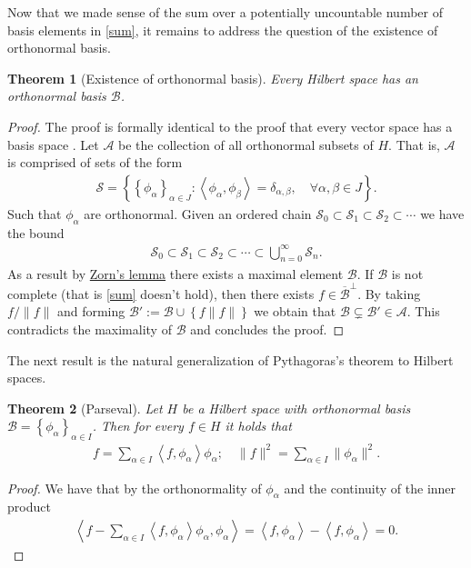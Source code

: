 \documentclass[12pt]{article}
\newtheorem{theorem}{Theorem}
\newcommand{\br}[1]{\left\langle#1\right\rangle} \newcommand{\set}[1]{\left\{#1\right\}}\newcommand{\qt}[1]{\left(#1\right)} \newcommand{\qp}[1]{\left(#1\right)}\newcommand{\qb}[1]{\left[#1\right]}
\renewcommand{\norm}[1]{\lVert #1 \rVert}\renewcommand{\abs}[1]{\left| #1 \right|}
\newcommand{\Aa}{\mathcal{A}}\newcommand{\Bb}{\mathcal{B}}\newcommand{\Cc}{\mathcal{C}}\newcommand{\Dd}{\mathcal{D}}\newcommand{\Ee}{\mathcal{E}}\newcommand{\Ff}{\mathcal{F}}\newcommand{\Gg}{\mathcal{G}}\newcommand{\Hh}{\mathcal{H}}\newcommand{\Kk}{\mathcal{K}}\newcommand{\Ll}{\mathcal{L}}\newcommand{\Mm}{\mathcal{M}}\newcommand{\Nn}{\mathcal{N}}\newcommand{\Pp}{\mathcal{P}}\newcommand{\Qq}{\mathcal{Q}}\newcommand{\Rr}{\mathcal{R}}\newcommand{\Ss}{\mathcal{S}}\newcommand{\Tt}{\mathcal{T}}\newcommand{\Uu}{\mathcal{U}}\newcommand{\Ww}{\mathcal{W}}\newcommand{\XX}{\mathcal {X}}\newcommand{\Zz}{\mathcal{Z}}
\begin{document}
\begin{CJK*}{UTF8}{gbsn}
	Now that we made sense of the sum over a potentially uncountable number of basis elements in \eqref{sum}, it remains to address the question of the existence of orthonormal basis.
	\begin{theorem}[Existence of orthonormal basis]\label{existence} Every Hilbert space has an orthonormal basis $\Bb$.
	\end{theorem}
	\begin{proof}
		The proof is formally identical to the proof that every vector space has a basis space . Let $\Aa$ be the collection of all orthonormal subsets of $H$. That is,  $\Aa$ is comprised of sets of the form
		\begin{align*}
			\Ss=\set{\set{\phi_\alpha}_{\alpha \in  J}:  \br{\phi_\alpha,\phi_\beta }= \delta _{\alpha, \beta }, \quad\forall \alpha,\beta \in J} .
		\end{align*}
		Such that $\phi_\alpha$ are orthonormal. Given an ordered chain $\Ss_0\subset \Ss_1\subset \Ss_2\subset \cdots$ we have the bound
		\begin{align*}
			\Ss_0\subset \Ss_1\subset \Ss_2\subset \cdots \subset \bigcup_{n=0}^\infty \Ss_n  .
		\end{align*}
		As a result by \href{https://en.wikipedia.org/wiki/Zorn%27s_lemma}{Zorn's lemma} there exists a maximal element $\Bb$. If $\Bb$ is not complete (that is \eqref{sum} doesn't hold), then there exists $f \in \overline{\Bb}^\perp$. By taking $f /\norm{f}$ and forming $\Bb':=\Bb \cup \set{f \norm{f}} $ we obtain that $\Bb \subsetneq \Bb' \in \Aa$. This contradicts the maximality of $\Bb$ and concludes the proof.
	\end{proof}
	The next result is the natural  generalization of Pythagoras's theorem to Hilbert spaces.
	\begin{theorem}[Parseval]\label{Parseval}
		Let $H$ be a Hilbert space with orthonormal basis  $\Bb=\set{\phi_\alpha}_{\alpha\in I}$. Then for every $f \in  H$ it holds that
		\begin{align*}
			f= \sum_{\alpha \in  I} \br{f,\phi_\alpha}\phi_\alpha;\quad \norm{f}^2=\sum_{\alpha\in I} \norm{\phi_\alpha}^2.
		\end{align*}
	\end{theorem}
	\begin{proof}
		We have that by the orthonormality of $\phi_\alpha$ and the continuity of the inner product
		\begin{align*}
			\br{f-\sum_{\alpha \in  I} \br{f,\phi_\alpha}\phi_\alpha, \phi_\alpha}=\br{f,\phi_\alpha}-\br{f,\phi_\alpha}=0.

\end{align*}
\end{proof}
\end{CJK*}
\end{document}
